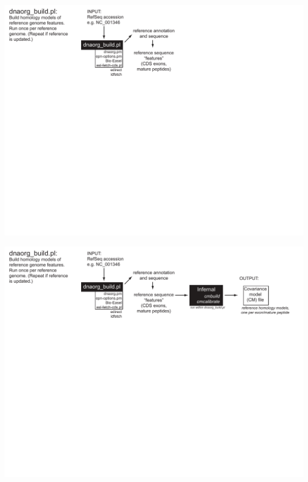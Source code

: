 \documentclass[landscape]{slides}
\begin{document}
\begin{slide}
\begin{center}
\includegraphics[width=10.5in]{figs/dnaorg-scripts-build1}
\vfill
\end{center}
\end{slide}
\begin{slide}
\begin{center}
\includegraphics[width=10.5in]{figs/dnaorg-scripts-build2}
\vfill
\end{center}
\end{slide}
\end{document}
